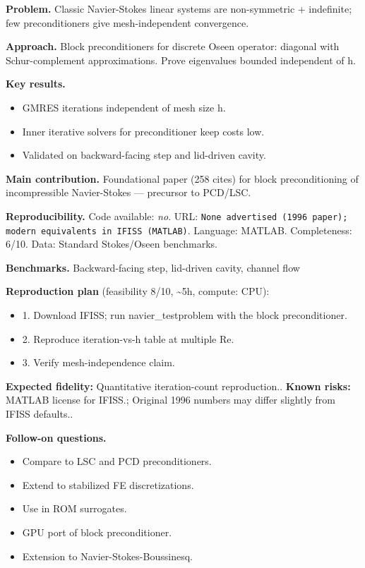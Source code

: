 \documentclass[10pt,letterpaper]{article}
\begin{document}
\textbf{Problem.} Classic Navier-Stokes linear systems are non-symmetric + indefinite; few preconditioners give mesh-independent convergence.

\textbf{Approach.} Block preconditioners for discrete Oseen operator: diagonal with Schur-complement approximations. Prove eigenvalues bounded independent of h.

\textbf{Key results.}
\begin{itemize}
\item GMRES iterations independent of mesh size h.
\item Inner iterative solvers for preconditioner keep costs low.
\item Validated on backward-facing step and lid-driven cavity.
\end{itemize}

\textbf{Main contribution.} Foundational paper (258 cites) for block preconditioning of incompressible Navier-Stokes — precursor to PCD/LSC.

\textbf{Reproducibility.} Code available: \emph{no}. URL: \texttt{None advertised (1996 paper); modern equivalents in IFISS (MATLAB)}. Language: MATLAB. Completeness: 6/10. Data: Standard Stokes/Oseen benchmarks.

\textbf{Benchmarks.} Backward-facing step, lid-driven cavity, channel flow

\textbf{Reproduction plan} (feasibility 8/10, \textasciitilde5h, compute: CPU):
\begin{itemize}
\item 1. Download IFISS; run navier\_testproblem with the block preconditioner.
\item 2. Reproduce iteration-vs-h table at multiple Re.
\item 3. Verify mesh-independence claim.
\end{itemize}
\textbf{Expected fidelity:} Quantitative iteration-count reproduction.. \textbf{Known risks:} MATLAB license for IFISS.; Original 1996 numbers may differ slightly from IFISS defaults..

\textbf{Follow-on questions.}
\begin{itemize}
\item Compare to LSC and PCD preconditioners.
\item Extend to stabilized FE discretizations.
\item Use in ROM surrogates.
\item GPU port of block preconditioner.
\item Extension to Navier-Stokes-Boussinesq.
\end{itemize}
\end{document}
